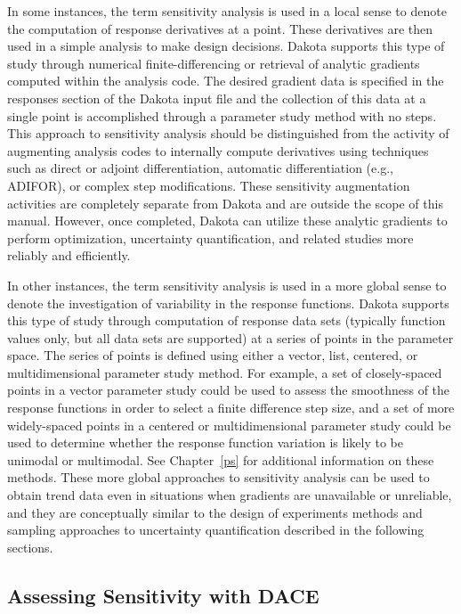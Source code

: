In some instances, the term sensitivity analysis is used in a local
sense to denote the computation of response derivatives at a point.
These derivatives are then used in a simple analysis to make design
decisions. Dakota supports this type of study through numerical
finite-differencing or retrieval of analytic gradients computed within
the analysis code. The desired gradient data is specified in the
responses section of the Dakota input file and the collection of this
data at a single point is accomplished through a parameter study
method with no steps. This approach to sensitivity analysis should be
distinguished from the activity of augmenting analysis codes to
internally compute derivatives using techniques such as direct or
adjoint differentiation, automatic differentiation (e.g., ADIFOR), or
complex step modifications. These sensitivity augmentation activities
are completely separate from Dakota and are outside the scope of this
manual. However, once completed, Dakota can utilize these analytic
gradients to perform optimization, uncertainty quantification, and
related studies more reliably and efficiently.

In other instances, the term sensitivity analysis is used in a more
global sense to denote the investigation of variability in the
response functions. Dakota supports this type of study through
computation of response data sets (typically function values only, but
all data sets are supported) at a series of points in the parameter
space. The series of points is defined using either a vector, list,
centered, or multidimensional parameter study method. For example, a
set of closely-spaced points in a vector parameter study could be used
to assess the smoothness of the response functions in order to select
a finite difference step size, and a set of more widely-spaced points
in a centered or multidimensional parameter study could be used to
determine whether the response function variation is likely to be
unimodal or multimodal. See Chapter~\ref{ps} for additional
information on these methods. These more global approaches to
sensitivity analysis can be used to obtain trend data even in
situations when gradients are unavailable or unreliable, and they are
conceptually similar to the design of experiments methods and sampling
approaches to uncertainty quantification described in the following
sections.

\subsection{Assessing Sensitivity with DACE}\label{dace:sa:assessing}

